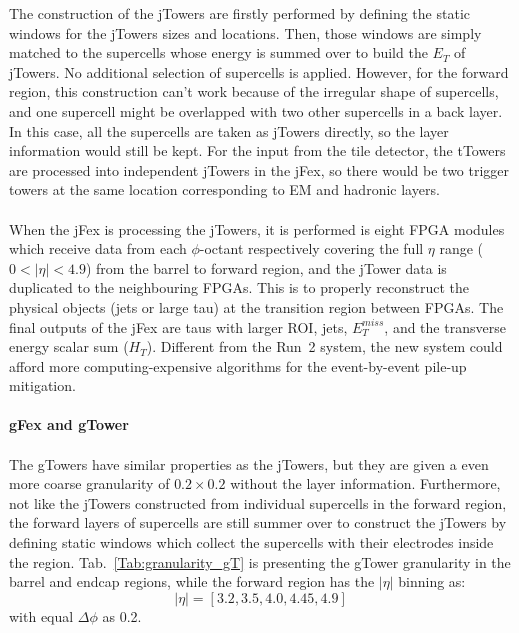 The construction of the jTowers are firstly performed by defining the static windows for the jTowers sizes and locations. Then, those windows are simply matched to the supercells whose energy is summed over to build the $E_{T}$ of jTowers. No additional selection of supercells is applied. However, for the forward region, this construction can't work because of the irregular shape of supercells, and one supercell might be overlapped with two other supercells in a back layer. In this case, all the supercells are taken as jTowers directly, so the layer information would still be kept. For the input from the tile detector, the tTowers are processed into independent jTowers in the jFex, so there would be two trigger towers at the same location corresponding to EM and hadronic layers. 
\\
\\When the jFex is processing the jTowers, it is performed is eight FPGA modules which receive data from each $\phi$-octant respectively covering the full $\eta$ range ($0<|\eta|<4.9$) from the barrel to forward region, and the jTower data is duplicated to the neighbouring FPGAs\cite{Aad:1602235}. This is to properly reconstruct the physical objects (jets or large tau) at the transition region between FPGAs. The final outputs of the jFex are taus with larger ROI, jets, $E^{miss}_{T}$, and the transverse energy scalar sum ($H_{T}$). Different from the Run~2 system, the new system could afford more computing-expensive algorithms for the event-by-event pile-up mitigation.
\\
\\{\bf gFex and gTower}
\\
\\The gTowers have similar properties as the jTowers, but they are given a even more coarse granularity of $0.2\times0.2$ without the layer information. Furthermore, not like the jTowers constructed from individual supercells in the forward region, the forward layers of supercells are still summer over to construct the jTowers by defining static windows which collect the supercells with their electrodes inside the region. Tab.~\ref{Tab:granularity_gT} is presenting the gTower granularity in the barrel and endcap regions, while the forward region has the $|\eta|$ binning as:
\begin{equation}
|\eta| = \left[3.2, 3.5, 4.0, 4.45, 4.9\right]
\end{equation}
with equal $\Delta\phi$ as 0.2.
